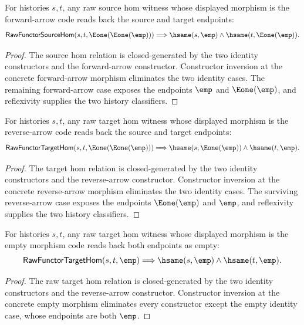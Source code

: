 \begin{theorem}
\label{thm:raw-functor-source-hom-forward-arrow-endpoint-readback}
For histories $s,t$, any raw source hom witness whose displayed morphism is the
forward-arrow code reads back the source and target endpoints:
$$
\mathsf{RawFunctorSourceHom}(s,t,\Eone(\Eone(\emp)))
\Longrightarrow
\hsame(s,\emp)\land\hsame(t,\Eone(\emp)).
$$
\end{theorem}
\begin{proof}
The source hom relation is closed-generated by the two identity constructors
and the forward-arrow constructor. Constructor inversion at the concrete
forward-arrow morphism eliminates the two identity cases. The remaining
forward-arrow case exposes the endpoints $\emp$ and $\Eone(\emp)$, and
reflexivity supplies the two history classifiers.
\end{proof}

\begin{theorem}
\label{thm:raw-functor-target-hom-reverse-arrow-endpoint-readback}
For histories $s,t$, any raw target hom witness whose displayed morphism is the
reverse-arrow code reads back the source and target endpoints:
$$
\mathsf{RawFunctorTargetHom}(s,t,\Eone(\Eone(\emp)))
\Longrightarrow
\hsame(s,\Eone(\emp))\land\hsame(t,\emp).
$$
\end{theorem}
\begin{proof}
The target hom relation is closed-generated by the two identity constructors
and the reverse-arrow constructor. Constructor inversion at the concrete
reverse-arrow morphism eliminates the two identity cases. The surviving
reverse-arrow case exposes the endpoints $\Eone(\emp)$ and $\emp$, and
reflexivity supplies the two history classifiers.
\end{proof}

\begin{theorem}
\label{thm:raw-functor-target-hom-empty-morphism-endpoint-readback}
For histories $s,t$, any raw target hom witness whose displayed morphism is the
empty morphism code reads back both endpoints as empty:
$$
\mathsf{RawFunctorTargetHom}(s,t,\emp)
\Longrightarrow
\hsame(s,\emp)\land\hsame(t,\emp).
$$
\end{theorem}
\begin{proof}
The raw target hom relation is closed-generated by the two identity
constructors and the reverse-arrow constructor. Constructor inversion at the
concrete empty morphism eliminates every constructor except the empty identity
case, whose endpoints are both $\emp$.
\end{proof}

